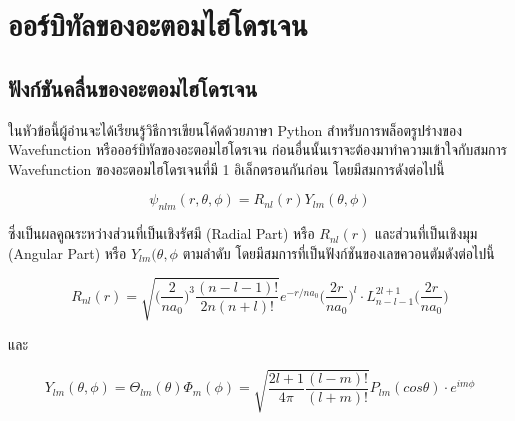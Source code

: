 

\chapter{ออร์บิทัลของอะตอมไฮโดรเจน}
\label{ch:hydro_orbitals}

\section{ฟังก์ชันคลื่นของอะตอมไฮโดรเจน}
\label{sec:hydro_wfn}

ในหัวข้อนี้ผู้อ่านจะได้เรียนรู้วิธีการเขียนโค้ดด้วยภาษา Python สำหรับการพล็อตรูปร่างของ Wavefunction หรือออร์บิทัลของอะตอมไฮโดรเจน 
ก่อนอื่นนั้นเราจะต้องมาทำความเข้าใจกับสมการ Wavefunction ของอะตอมไฮโดรเจนที่มี 1 อิเล็กตรอนกันก่อน โดยมีสมการดังต่อไปนี้

\begin{equation}\label{eq:hydro_wfn}
    \psi_{nlm}(r,\theta,\phi) = R_{nl}(r) Y_{lm}(\theta,\phi)
\end{equation}

\noindent ซึ่งเป็นผลคูณระหว่างส่วนที่เป็นเชิงรัศมี (Radial Part) หรือ $R_{nl}(r)$ และส่วนที่เป็นเชิงมุม (Angular Part) หรือ 
$Y_{lm}(\theta, \phi$ ตามลำดับ โดยมีสมการที่เป็นฟังก์ชันของเลขควอนตัมดังต่อไปนี้

\begin{equation}\label{eq:hydro_wfn_rad}
R_{nl}(r) = \sqrt{\Big(\frac{2}{n a_0}\Big)^3 \frac{(n-l-1)!}{2n (n+l)!}} e^{-r/n a_0} 
    \Big( \frac{2r}{na_0}\Big)^l  \cdot L^{2l+1}_{n-l-1} \Big(\frac{2r}{n a_0} \Big)
\end{equation}

\noindent และ

\begin{equation}\label{eq:hydro_wfn_ang}
Y_{lm}(\theta,\phi) = \Theta_{lm}(\theta) \Phi_m (\phi) = \sqrt{\frac{2l+1}{4\pi} \frac{(l-m)!}{(l+m)!} } 
    P_{lm}(cos \theta) \cdot e^{im\phi}
\end{equation}

